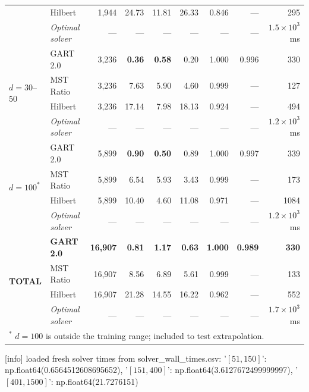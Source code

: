 \begin{table}[!ht]
{\begin{tabular}{@{}ll rrrrrrr@{}}
    & Hilbert & 1{,}944 & 24.73 & 11.81 & 26.33 & 0.846 & --- & 295 \\
    & \textit{Optimal solver} & --- & --- & --- & --- & --- & --- & $1.5\times 10^{3}$~ms \\
    \midrule
    \multirow{4}{*}{$d=30$--$50$}
    & GART 2.0 & 3{,}236 & \textbf{0.36} & \textbf{0.58} & 0.20 & 1.000 & 0.996 & 330 \\
    & MST Ratio & 3{,}236 & 7.63 & 5.90 & 4.60 & 0.999 & --- & 127 \\
    & Hilbert & 3{,}236 & 17.14 & 7.98 & 18.13 & 0.924 & --- & 494 \\
    & \textit{Optimal solver} & --- & --- & --- & --- & --- & --- & $1.2\times 10^{3}$~ms \\
    \midrule
    \multirow{4}{*}{$d=100^{*}$}
    & GART 2.0 & 5{,}899 & \textbf{0.90} & \textbf{0.50} & 0.89 & 1.000 & 0.997 & 339 \\
    & MST Ratio & 5{,}899 & 6.54 & 5.93 & 3.43 & 0.999 & --- & 173 \\
    & Hilbert & 5{,}899 & 10.40 & 4.60 & 11.08 & 0.971 & --- & 1084 \\
    & \textit{Optimal solver} & --- & --- & --- & --- & --- & --- & $1.2\times 10^{3}$~ms \\
    \midrule
    \multirow{4}{*}{\textbf{TOTAL}}
    & \textbf{GART 2.0} & \textbf{16{,}907} & \textbf{0.81} & \textbf{1.17} & \textbf{0.63} & \textbf{1.000} & \textbf{0.989} & \textbf{330} \\
    & MST Ratio & 16{,}907 & 8.56 & 6.89 & 5.61 & 0.999 & --- & 133 \\
    & Hilbert & 16{,}907 & 21.28 & 14.55 & 16.22 & 0.962 & --- & 552 \\
    & \textit{Optimal solver} & --- & --- & --- & --- & --- & --- & $1.7\times 10^{3}$~ms \\
\bottomrule
\multicolumn{9}{l}{\footnotesize $^{*}$ $d = 100$ is outside the training range; included to test extrapolation.}
\end{tabular}%
}
\end{table}
[info] loaded fresh solver times from solver_wall_times.csv: {'$[51,150]$': np.float64(0.6564512608695652), '$[151,400]$': np.float64(3.6127672499999997), '$[401,1500]$': np.float64(21.7276151)}

